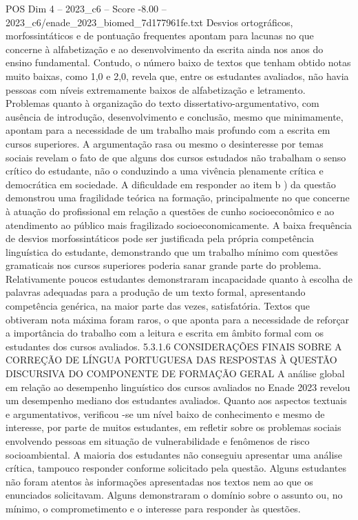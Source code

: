 \begin{textsample}{POS Dim 4 – 2023\_c6 – Score -8.00 – 2023\_c6/enade\_2023\_biomed\_7d177961fe.txt}
Desvios ortográficos, morfossintáticos e de pontuação frequentes apontam para lacunas no que concerne à alfabetização e ao desenvolvimento da escrita ainda nos anos do ensino fundamental.
Contudo, o número baixo de textos que tenham obtido notas muito baixas, como 1,0 e 2,0, revela que, entre os estudantes avaliados, não havia pessoas com níveis extremamente baixos de alfabetização e letramento.
Problemas quanto à organização do texto dissertativo-argumentativo, com ausência de introdução, desenvolvimento e conclusão, mesmo que minimamente, apontam para a necessidade de um trabalho mais profundo com a escrita em cursos superiores.
A argumentação rasa ou mesmo o desinteresse por temas sociais revelam o fato de que alguns dos cursos estudados não trabalham o senso crítico do estudante, não o conduzindo a uma vivência plenamente crítica e democrática em sociedade.
A dificuldade em responder ao item b ) da questão demonstrou uma fragilidade teórica na formação, principalmente no que concerne à atuação do profissional em relação a questões de cunho socioeconômico e ao atendimento ao público mais fragilizado socioeconomicamente.
A baixa frequência de desvios morfossintáticos pode ser justificada pela própria competência linguística do estudante, demonstrando que um trabalho mínimo com questões gramaticais nos cursos superiores poderia sanar grande parte do problema.
Relativamente poucos estudantes demonstraram incapacidade quanto à escolha de palavras adequadas para a produção de um texto formal, apresentando competência genérica, na maior parte das vezes, satisfatória.
Textos que obtiveram nota máxima foram raros, o que aponta para a necessidade de reforçar a importância do trabalho com a leitura e escrita em âmbito formal com os estudantes dos cursos avaliados. 5.3.1.6 CONSIDERAÇÕES FINAIS SOBRE A CORREÇÃO DE LÍNGUA PORTUGUESA DAS RESPOSTAS À QUESTÃO DISCURSIVA DO COMPONENTE DE FORMAÇÃO GERAL A análise global em relação ao desempenho linguístico dos cursos avaliados no Enade 2023 revelou um desempenho mediano dos estudantes avaliados.
Quanto aos aspectos textuais e argumentativos, verificou -se um nível baixo de conhecimento e mesmo de interesse, por parte de muitos estudantes, em refletir sobre os problemas sociais envolvendo pessoas em situação de vulnerabilidade e fenômenos de risco socioambiental.
A maioria dos estudantes não conseguiu apresentar uma análise crítica, tampouco responder conforme solicitado pela questão.
Alguns estudantes não foram atentos às informações apresentadas nos textos nem ao que os enunciados solicitavam.
Alguns demonstraram o domínio sobre o assunto ou, no mínimo, o comprometimento e o interesse para responder às questões.

\end{textsample}
